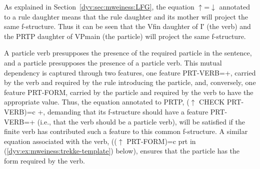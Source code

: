 \documentclass[output=paper]{langsci/langscibook}
\begin{document}
%
%

As explained in Section~\ref{dyv:sec:mweiness:LFG}, the equation $\uparrow$=$\downarrow$ annotated to a rule daughter means that the rule daughter and its mother will project the same f-structure.
Thus it can be seen that the Vfin daughter of I′ (the verb) and the PRTP daughter of VPmain (the particle) will project the same f-structure.

A particle verb presupposes the presence of the required particle in the sentence, and a particle presupposes the presence of a particle verb.
This mutual dependency is captured through two features, one feature PRT-VERB=+, carried by the verb and required by the rule introducing the particle, and, conversely, one feature PRT-FORM, carried by the particle and required by the verb to have the appropriate value.
Thus, the  equation annotated to PRTP, ($\uparrow$ CHECK PRT-VERB)=c +, demanding that its f-structure should have a feature PRT-VERB=+ (i.e., that the verb should be a particle verb), will be satisfied if the finite verb has contributed such a feature to this common f-structure.
A similar  equation associated with the verb, (($\uparrow$ PRT-FORM)=c prt in (\ref{dyv:ex:mweiness:trekke-template}) below), ensures that the particle has the form required by the verb.
\end{document}
